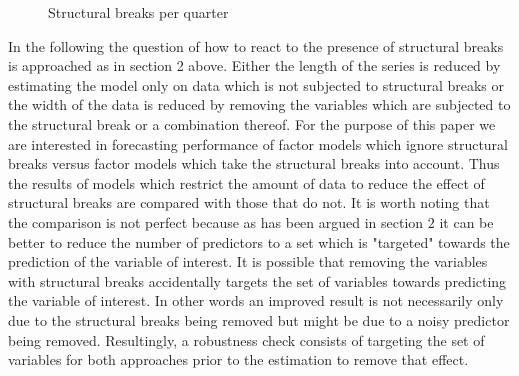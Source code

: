 \documentclass[11pt]{article}
\begin{document}
\begin{figure}[htp]
\centering
\label{structural breaks per period}
\caption{Structural breaks per quarter}
\end{figure}

In the following the question of how to react to the presence of structural breaks is approached as in section 2 above. Either the length of the series is reduced by estimating the model only on data which is not subjected to structural breaks or the width of the data is reduced by removing the variables which are subjected to the structural break or a combination thereof. For the purpose of this paper we are interested in forecasting performance of factor models which ignore structural breaks versus factor models which take the structural breaks into account. Thus the results of models which restrict the amount of data to reduce the effect of structural breaks are compared with those that do not. It is worth noting that the comparison is not perfect because as has been argued in section $2$ it can be better to reduce the number of predictors to a set which is "targeted" towards the prediction of the variable of interest. It is possible that removing the variables with structural breaks accidentally targets the set of variables towards predicting the variable of interest. In other words an improved result is not necessarily only due to the structural breaks being removed but might be due to a noisy predictor being removed.
Resultingly, a robustness check consists of targeting the set of variables for both approaches prior to the estimation to remove that effect.
\end{document}
